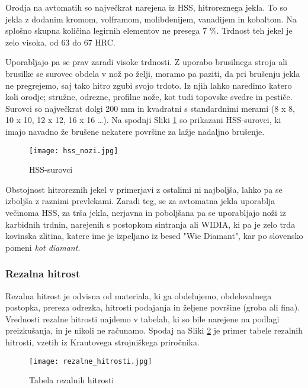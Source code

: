 Orodja na avtomatih so največkrat narejena iz HSS,
hitroreznega jekla. To so jekla z dodanim kromom, volframom,
molibdenijem, vanadijem in kobaltom. Na splošno skupna količina
legirnih elementov ne presega 7 \%. Trdnost teh jekel je zelo visoka,
od 63 do 67 HRC.

Uporabljajo pa se prav zaradi visoke trdnosti. Z uporabo
brusilnega stroja ali brusilke se surovec obdela v nož po želji,
moramo pa paziti, da pri brušenju jekla ne pregrejemo, saj tako
hitro zgubi svojo trdoto.
Iz njih lahko naredimo katero koli orodje; stružne, odrezne,
profilne nože, kot tudi topovske svedre in pestiče. Surovci so
največkrat dolgi 200 mm in kvadratni s standardnimi merami
(8 x 8, 10 x 10, 12 x 12, 16 x 16 …). Na spodnji Sliki \ref{hss_nozi}
so prikazani HSS-surovci, ki imajo navadno že brušene
nekatere površine za lažje nadaljno brušenje.

\begin{figure}[H]
	\begin{center}
		\texttt{[image: hss\_nozi.jpg]}
		\caption{HSS-surovci
			\cite{hss_nozi}}
		\label{hss_nozi}
	\end{center}
\end{figure}

Obstojnost hitroreznih jekel v primerjavi z ostalimi ni najboljša,
lahko pa se izboljša z raznimi prevlekami. Zaradi teg, se za
avtomatna jekla uporablja večinoma HSS, za trša jekla, nerjavna
in poboljšana pa se uporabljajo noži iz karbidnih trdnin,
narejenih s postopkom sintranja ali WIDIA, ki pa je zelo trda
kovinska zlitina, katere ime je izpeljano iz besed "Wie Diamant",
kar po slovensko pomeni \textit{kot diamant}.

\subsubsection{Rezalna hitrost}
Rezalna hitrost je odvisna od materiala, ki ga obdelujemo,
obdelovalnega postopka, prereza odrezka, hitrosti podajanja
in željene površine (groba ali fina). Vrednosti rezalne hitrosti
najdemo v tabelah, ki so bile narejene na podlagi preizkušanja,
in je nikoli ne računamo. Spodaj na Sliki \ref{rezalna_hitrost}
je primer tabele rezalnih hitrosti, vzetih iz Krautovega strojniškega
priročnika.

\begin{figure}[H]
	\begin{center}
		\texttt{[image: rezalne\_hitrosti.jpg]}
		\caption{Tabela rezalnih hitrosti
			\cite{strojniski_prirocnik}}
		\label{rezalna_hitrost}
	\end{center}
\end{figure}

